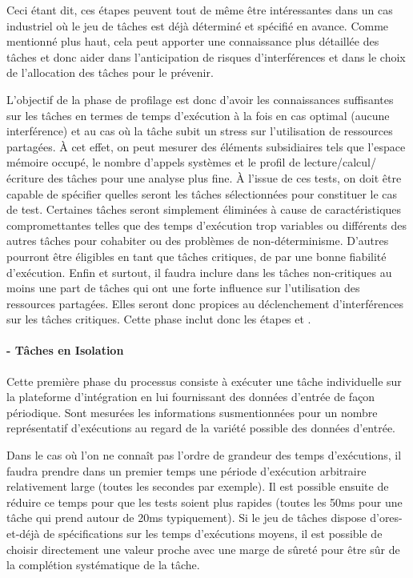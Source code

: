 \documentclass[french, a4paper, 11pt, twoside, pdftex]{StyleThese}
\begin{document}
		Ceci étant dit, ces étapes peuvent tout de même être intéressantes dans un cas industriel où le jeu de tâches est déjà déterminé et spécifié en avance. Comme mentionné plus haut, cela peut apporter une connaissance plus détaillée des tâches et donc aider dans l'anticipation de risques d'interférences et dans le choix de l'allocation des tâches pour le prévenir.
		
		L'objectif de la phase de profilage est donc d'avoir les connaissances suffisantes sur les tâches en termes de temps d'exécution à la fois en cas optimal (aucune interférence) et au cas où la tâche subit un stress sur l'utilisation de ressources partagées. À cet effet, on peut mesurer des éléments subsidiaires tels que l'espace mémoire occupé, le nombre d'appels systèmes et le profil de lecture/calcul/écriture des tâches pour une analyse plus fine. À l'issue de ces tests, on doit être capable de spécifier quelles seront les tâches sélectionnées pour constituer le cas de test. Certaines tâches seront simplement éliminées à cause de caractéristiques compromettantes telles que des temps d'exécution trop variables ou différents des autres tâches pour cohabiter ou des problèmes de non-déterminisme. D'autres pourront être éligibles en tant que tâches critiques, de par une bonne fiabilité d'exécution. Enfin et surtout, il faudra inclure dans les tâches non-critiques au moins une part de tâches qui ont une forte influence sur l'utilisation des ressources partagées. Elles seront donc propices au déclenchement d'interférences sur les tâches critiques. Cette phase inclut donc les étapes  et .
		
		\paragraph{ - Tâches en Isolation}
			
			Cette première phase du processus consiste à exécuter une tâche individuelle sur la plateforme d'intégration en lui fournissant des données d'entrée de façon périodique. Sont mesurées les informations susmentionnées pour un nombre représentatif d'exécutions au regard de la variété possible des données d'entrée. 
			
			Dans le cas où l'on ne connaît pas l'ordre de grandeur des temps d'exécutions, il faudra prendre dans un premier temps une période d'exécution arbitraire relativement large (toutes les secondes par exemple). Il est possible ensuite de réduire ce temps pour que les tests soient plus rapides (toutes les 50ms pour une tâche qui prend autour de 20ms typiquement). Si le jeu de tâches dispose d'ores-et-déjà de spécifications sur les temps d'exécutions moyens, il est possible de choisir directement une valeur proche avec une marge de sûreté pour être sûr de la complétion systématique de la tâche.
			
\end{document}
